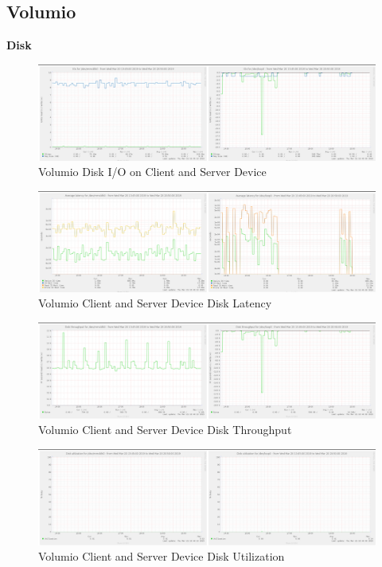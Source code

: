 \documentclass[11pt,a4paper,headinclude=false,footinclude=false]{scrreprt}
\begin{document}
\subsection{Volumio}\label{volumio-2}

\textbf{Disk}

\begin{figure}[H]
\includegraphics{ResultsAndAnalysis/VolumioServerTestImages/005VolumioDiskIO.png}
\centering
\caption{Volumio Disk I/O on Client and Server Device}
\label{VolumioDiskIO}
\end{figure}

\begin{figure}[H]
\includegraphics{ResultsAndAnalysis/VolumioServerTestImages/006VolumioDiskLatency.png}
\centering
\caption{Volumio Client and Server Device Disk Latency}
\label{VolumioDiskLatency}
\end{figure}

\begin{figure}[H]
\includegraphics{ResultsAndAnalysis/VolumioServerTestImages/007VolumioDiskThroughput.png}
\centering
\caption{Volumio Client and Server Device Disk Throughput}
\label{VolumioDiskThroughput}
\end{figure}

\begin{figure}[H]
\includegraphics{ResultsAndAnalysis/VolumioServerTestImages/009VolumioDiskUtilization.png}
\centering
\caption{Volumio Client and Server Device Disk Utilization}
\label{VolumioDiskUtil}
\end{figure}
\end{document}
